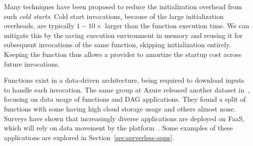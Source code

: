 Many techniques have been proposed to reduce the initialization overhead from such \emph{cold starts}.
Cold start invocations, because of the large initialization overheads, are typically $1-10\times$ larger than the function execution time.
We can mitigate this by the saving execution environment in memory and reusing it for subsequent invocations of the same function, skipping initialization entirely. 
Keeping the function  thus allows a provider to amortize the startup cost across future invocations.

Functions exist in a data-driven architecture, being required to download inputs to handle each invocation.
The same group at Azure released another dataset in~\cite{romero2021faa}, focusing on data usage of functions and DAG applications.
They found a split of functions with some having high cloud storage usage and others almost none.
Surveys have shown that increasingly diverse applications are deployed on FaaS, which will rely on data movement by the platform~\cite{raza2021sok,hossein2022survey,eismann2020serverless}.
Some examples of these applications are explored in Section~\ref{sec:serverless-apps}.




